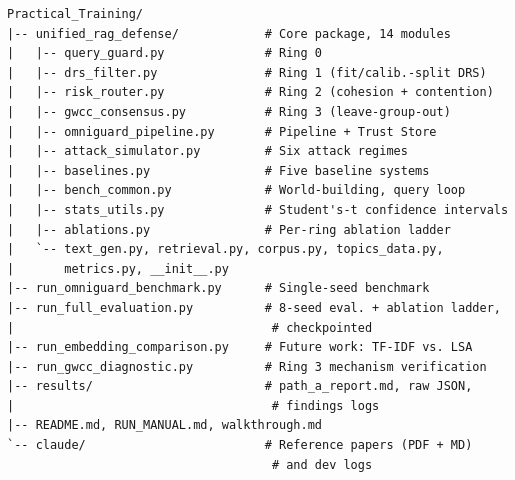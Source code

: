 \begin{small}
\begin{verbatim}
Practical_Training/
|-- unified_rag_defense/            # Core package, 14 modules
|   |-- query_guard.py              # Ring 0
|   |-- drs_filter.py               # Ring 1 (fit/calib.-split DRS)
|   |-- risk_router.py              # Ring 2 (cohesion + contention)
|   |-- gwcc_consensus.py           # Ring 3 (leave-group-out)
|   |-- omniguard_pipeline.py       # Pipeline + Trust Store
|   |-- attack_simulator.py         # Six attack regimes
|   |-- baselines.py                # Five baseline systems
|   |-- bench_common.py             # World-building, query loop
|   |-- stats_utils.py              # Student's-t confidence intervals
|   |-- ablations.py                # Per-ring ablation ladder
|   `-- text_gen.py, retrieval.py, corpus.py, topics_data.py,
|       metrics.py, __init__.py
|-- run_omniguard_benchmark.py      # Single-seed benchmark
|-- run_full_evaluation.py          # 8-seed eval. + ablation ladder,
|                                    # checkpointed
|-- run_embedding_comparison.py     # Future work: TF-IDF vs. LSA
|-- run_gwcc_diagnostic.py          # Ring 3 mechanism verification
|-- results/                        # path_a_report.md, raw JSON,
|                                    # findings logs
|-- README.md, RUN_MANUAL.md, walkthrough.md
`-- claude/                         # Reference papers (PDF + MD)
                                     # and dev logs
\end{verbatim}
\end{small}
